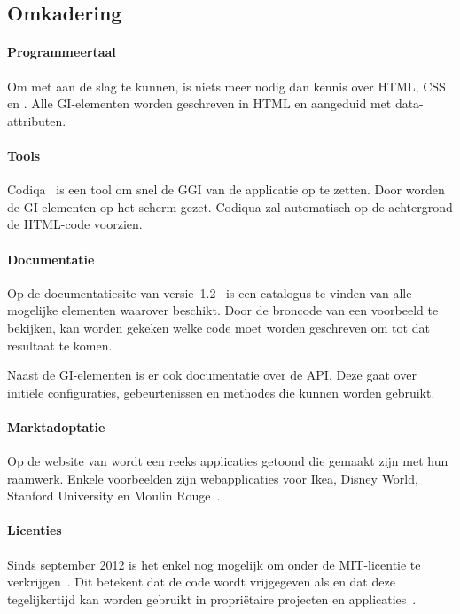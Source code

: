 \subsection{Omkadering}
\paragraph{Programmeertaal}
Om met \jqm{} aan de slag te kunnen, is niets meer nodig dan kennis over HTML, CSS en \js{}. 
Alle GI-elementen worden geschreven in HTML en aangeduid met data-attributen.

\paragraph{Tools}
Codiqa~\cite{Sperry2012} is een tool om snel de GGI van de applicatie op te zetten.
Door  worden de GI-elementen op het scherm gezet.
Codiqua zal automatisch op de achtergrond de HTML-code voorzien.

\paragraph{Documentatie}
Op de documentatiesite van versie~1.2~\cite{JQuery2012b} is een catalogus te vinden van alle mogelijke elementen waarover \jqm{} beschikt. 
Door de broncode van een voorbeeld te bekijken, kan worden gekeken welke code moet worden geschreven om tot dat resultaat te komen.

Naast de GI-elementen is er ook documentatie over de API. 
Deze gaat over initiële configuraties, gebeurtenissen en methodes die kunnen worden gebruikt.

\paragraph{Marktadoptatie}
Op de website van \jqm{} wordt een reeks applicaties getoond die gemaakt zijn met hun raamwerk. 
Enkele voorbeelden zijn webapplicaties voor Ikea, Disney World, Stanford University en Moulin Rouge~\cite{JQuery2012a}. 

\paragraph{Licenties}
Sinds september 2012 is het enkel nog mogelijk om \jqm{} onder de MIT-licentie te verkrijgen~\cite{Dmethvin2012}. 
Dit betekent dat de code wordt vrijgegeven als  en dat deze tegelijkertijd kan worden gebruikt in propriëtaire projecten en applicaties~\cite{PhilDutson2012}.

